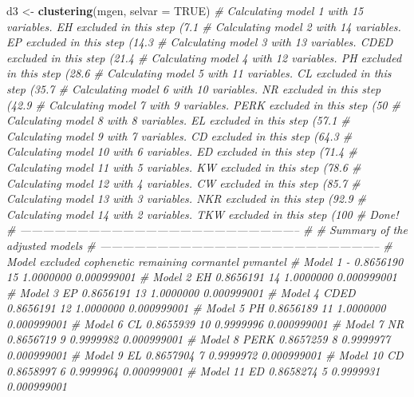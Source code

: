 \documentclass[
]{book}
\newenvironment{Shaded}{\begin{snugshade}}{\end{snugshade}}
\newcommand{\CommentTok}[1]{\textcolor[rgb]{0.56,0.35,0.01}{\textit{#1}}}
\newcommand{\DataTypeTok}[1]{\textcolor[rgb]{0.13,0.29,0.53}{#1}}
\newcommand{\KeywordTok}[1]{\textcolor[rgb]{0.13,0.29,0.53}{\textbf{#1}}}
\newcommand{\NormalTok}[1]{#1}
\newcommand{\OtherTok}[1]{\textcolor[rgb]{0.56,0.35,0.01}{#1}}
\newcommand{\StringTok}[1]{\textcolor[rgb]{0.31,0.60,0.02}{#1}}
\begin{document}
\begin{Shaded}
\begin{Highlighting}[]
\NormalTok{d3 <-}\StringTok{ }\KeywordTok{clustering}\NormalTok{(mgen, }\DataTypeTok{selvar =} \OtherTok{TRUE}\NormalTok{)}
\CommentTok{# Calculating model 1 with 15 variables. EH excluded in this step (7.1%
\CommentTok{# Calculating model 2 with 14 variables. EP excluded in this step (14.3%
\CommentTok{# Calculating model 3 with 13 variables. CDED excluded in this step (21.4%
\CommentTok{# Calculating model 4 with 12 variables. PH excluded in this step (28.6%
\CommentTok{# Calculating model 5 with 11 variables. CL excluded in this step (35.7%
\CommentTok{# Calculating model 6 with 10 variables. NR excluded in this step (42.9%
\CommentTok{# Calculating model 7 with 9 variables. PERK excluded in this step (50%
\CommentTok{# Calculating model 8 with 8 variables. EL excluded in this step (57.1%
\CommentTok{# Calculating model 9 with 7 variables. CD excluded in this step (64.3%
\CommentTok{# Calculating model 10 with 6 variables. ED excluded in this step (71.4%
\CommentTok{# Calculating model 11 with 5 variables. KW excluded in this step (78.6%
\CommentTok{# Calculating model 12 with 4 variables. CW excluded in this step (85.7%
\CommentTok{# Calculating model 13 with 3 variables. NKR excluded in this step (92.9%
\CommentTok{# Calculating model 14 with 2 variables. TKW excluded in this step (100%
\CommentTok{# Done! }
\CommentTok{# -------------------------------------------------------------------------- }
\CommentTok{# }
\CommentTok{# Summary of the adjusted models }
\CommentTok{# -------------------------------------------------------------------------- }
\CommentTok{#     Model excluded cophenetic remaining cormantel    pvmantel}
\CommentTok{#   Model 1        -  0.8656190        15 1.0000000 0.000999001}
\CommentTok{#   Model 2       EH  0.8656191        14 1.0000000 0.000999001}
\CommentTok{#   Model 3       EP  0.8656191        13 1.0000000 0.000999001}
\CommentTok{#   Model 4     CDED  0.8656191        12 1.0000000 0.000999001}
\CommentTok{#   Model 5       PH  0.8656189        11 1.0000000 0.000999001}
\CommentTok{#   Model 6       CL  0.8655939        10 0.9999996 0.000999001}
\CommentTok{#   Model 7       NR  0.8656719         9 0.9999982 0.000999001}
\CommentTok{#   Model 8     PERK  0.8657259         8 0.9999977 0.000999001}
\CommentTok{#   Model 9       EL  0.8657904         7 0.9999972 0.000999001}
\CommentTok{#  Model 10       CD  0.8658997         6 0.9999964 0.000999001}
\CommentTok{#  Model 11       ED  0.8658274         5 0.9999931 0.000999001}
}}}}}}}}}}}}}}
\end{Highlighting}
\end{Shaded}
\end{document}
